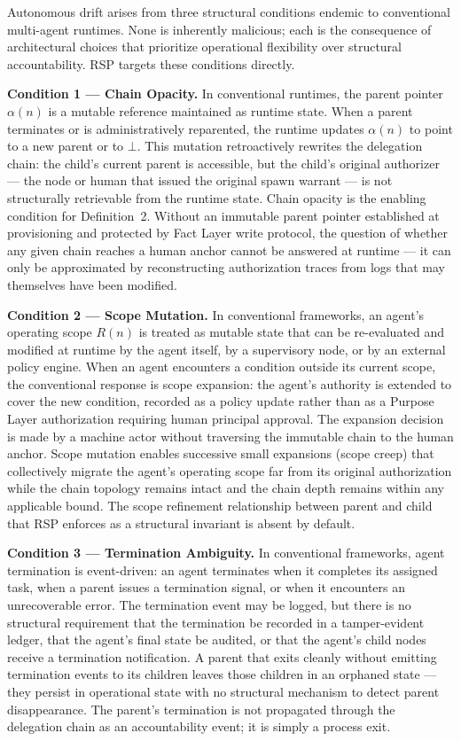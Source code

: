 \documentclass[12pt]{article}
\begin{document}
Autonomous drift arises from three structural conditions endemic to conventional multi-agent runtimes. None is inherently malicious; each is the consequence of architectural choices that prioritize operational flexibility over structural accountability. RSP targets these conditions directly.

\medskip
\noindent\textbf{Condition 1 — Chain Opacity.}
In conventional runtimes, the parent pointer $\alpha(n)$ is a mutable reference maintained as runtime state. When a parent terminates or is administratively reparented, the runtime updates $\alpha(n)$ to point to a new parent or to $\bot$. This mutation retroactively rewrites the delegation chain: the child's current parent is accessible, but the child's original authorizer — the node or human that issued the original spawn warrant — is not structurally retrievable from the runtime state. Chain opacity is the enabling condition for Definition~2. Without an immutable parent pointer established at provisioning and protected by Fact Layer write protocol, the question of whether any given chain reaches a human anchor cannot be answered at runtime — it can only be approximated by reconstructing authorization traces from logs that may themselves have been modified.

\medskip
\noindent\textbf{Condition 2 — Scope Mutation.}
In conventional frameworks, an agent's operating scope $R(n)$ is treated as mutable state that can be re-evaluated and modified at runtime by the agent itself, by a supervisory node, or by an external policy engine. When an agent encounters a condition outside its current scope, the conventional response is scope expansion: the agent's authority is extended to cover the new condition, recorded as a policy update rather than as a Purpose Layer authorization requiring human principal approval. The expansion decision is made by a machine actor without traversing the immutable chain to the human anchor. Scope mutation enables successive small expansions (scope creep) that collectively migrate the agent's operating scope far from its original authorization while the chain topology remains intact and the chain depth remains within any applicable bound. The scope refinement relationship between parent and child that RSP enforces as a structural invariant is absent by default.

\medskip
\noindent\textbf{Condition 3 — Termination Ambiguity.}
In conventional frameworks, agent termination is event-driven: an agent terminates when it completes its assigned task, when a parent issues a termination signal, or when it encounters an unrecoverable error. The termination event may be logged, but there is no structural requirement that the termination be recorded in a tamper-evident ledger, that the agent's final state be audited, or that the agent's child nodes receive a termination notification. A parent that exits cleanly without emitting termination events to its children leaves those children in an orphaned state — they persist in operational state with no structural mechanism to detect parent disappearance. The parent's termination is not propagated through the delegation chain as an accountability event; it is simply a process exit.
\end{document}
